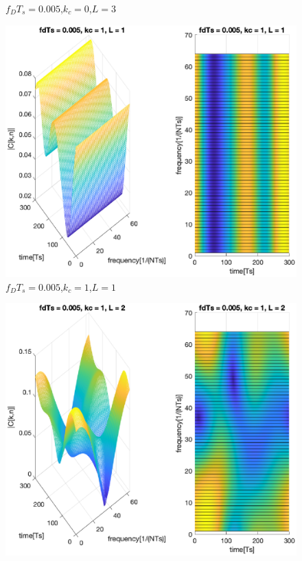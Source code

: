 \documentclass[conference]{IEEEtran}
\begin{document}
\begin{appendices}
\begin{figure}[H]
        \caption{$f_{D}T_{s}=0.005$,$k_{c}=0$,$L=3$}
        \label{0005_0_3}
    \end{figure}
    \begin{figure}[H]
        \centering
        \includegraphics[width=\linewidth]{Task2/0005_1_1.eps}
        \caption{$f_{D}T_{s}=0.005$,$k_{c}=1$,$L=1$}
        \label{0005_1_1}
    \end{figure}
    \begin{figure}[H]
        \centering
        \includegraphics[width=\linewidth]{Task2/0005_1_2.eps}

\end{figure}
\end{appendices}
\end{document}
